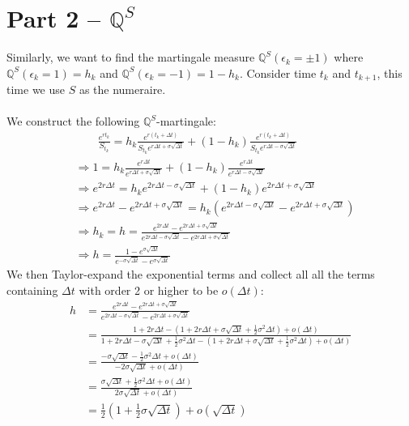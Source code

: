\documentclass[12pt, letterpaper]{article}
\begin{document}
\newpage
\section*{Part 2 -- $\mathbb{Q}^S$}
Similarly, we want to find the martingale measure $\mathbb{Q}^S(\epsilon_k = \pm 1)$ where $\mathbb{Q}^S(\epsilon_k =1) = h_k$ and $\mathbb{Q}^S(\epsilon_k =-1) = 1-h_k$. Consider 
time $t_k$ and $t_{k+1}$, this time we use $S$ as the numeraire. \\ \\
We construct the following $\mathbb{Q}^S$-martingale:
\begin{align*}
  &\qquad \frac{e^{rt_k}}{S_{t_k}} = h_k\frac{e^{r(t_k+\Delta t)}}{S_{t_k}e^{r\Delta t + \sigma \sqrt{\Delta t}}} + (1-h_k)\frac{e^{r(t_k+\Delta t)}}{S_{t_k}e^{r\Delta t - \sigma \sqrt{\Delta t}}}\\
  &\Rightarrow  1 = h_k\frac{e^{r\Delta t}}{e^{r\Delta t + \sigma \sqrt{\Delta t}}} + (1-h_k) \frac{e^{r\Delta t}}{e^{r\Delta t - \sigma \sqrt{\Delta t}}} \\
  &\Rightarrow e^{2r\Delta t} = h_ke^{2r\Delta t - \sigma \sqrt{\Delta t}} + (1-h_k)e^{2r\Delta t + \sigma \sqrt{\Delta t}}\\
  &\Rightarrow e^{2r\Delta t} - e^{2r\Delta t + \sigma \sqrt{\Delta t}} = h_k(e^{2r\Delta t - \sigma \sqrt{\Delta t}} - e^{2r\Delta t + \sigma \sqrt{\Delta t}}) \\
  &\Rightarrow h_k = h = \frac{e^{2r\Delta t} - e^{2r\Delta t + \sigma \sqrt{\Delta t}}}{e^{2r\Delta t - \sigma \sqrt{\Delta t}} - e^{2r\Delta t + \sigma \sqrt{\Delta t}}} \tag*{As $h_k$ does not depend on $k$} \\
  & \Rightarrow h = \frac{1-e^{\sigma \sqrt{\Delta t}}}{e^{-\sigma \sqrt{\Delta t}}-e^{\sigma \sqrt{\Delta t}}}
\end{align*}
We then Taylor-expand the exponential terms and collect all all the terms containing $\Delta t$ with order 2 or higher to be $o(\Delta t)$:
\begin{align*}
  h &= \frac{e^{2r\Delta t} - e^{2r\Delta t + \sigma \sqrt{\Delta t}}}{e^{2r\Delta t - \sigma \sqrt{\Delta t}} - e^{2r\Delta t + \sigma \sqrt{\Delta t}}} \\
    &= \frac{1+2r\Delta t - (1+2r\Delta t+\sigma \sqrt{\Delta t} + \frac{1}{2} \sigma^2\Delta t) + o(\Delta t)}
        {1+2r\Delta t - \sigma \sqrt{\Delta t} + \frac{1}{2} \sigma^2\Delta t - (1+2r\Delta t+\sigma \sqrt{\Delta t} + \frac{1}{2} \sigma^2\Delta t) + o(\Delta t)}\\
    &= \frac{-\sigma \sqrt{\Delta t} - \frac{1}{2} \sigma^2\Delta t+ o(\Delta t)}{-2\sigma \sqrt{\Delta t} +o(\Delta t)}\\
    &= \frac{\sigma \sqrt{\Delta t} + \frac{1}{2} \sigma^2\Delta t+ o(\Delta t)}{2\sigma \sqrt{\Delta t} +o(\Delta t)}\\
    &= \frac{1}{2}(1+\frac{1}{2}\sigma \sqrt{\Delta t}) + o(\sqrt{\Delta t})
\end{align*}
\end{document}
